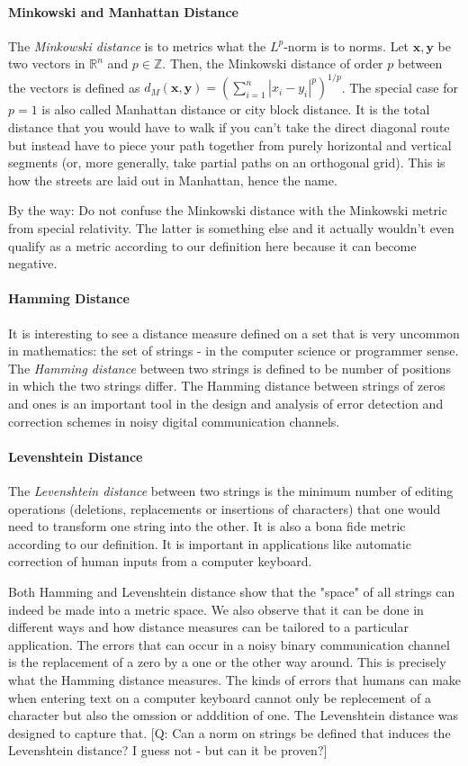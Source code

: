 \paragraph{Minkowski and Manhattan Distance}
The \emph{Minkowski distance} is to metrics what the $L^p$-norm is to norms. Let $\mathbf{x,y}$ be two vectors in $\mathbb{R}^n$ and $p \in \mathbb{Z}$. Then, the Minkowski distance of order $p$ between the vectors is defined as $d_M(\mathbf{x,y}) = (\sum_{i=1}^n |x_i - y_i|^p )^{1/p}$. The special case for $p=1$ is also called Manhattan distance or city block distance. It is the total distance that you would have to walk if you can't take the direct diagonal route but instead have to piece your path together from purely horizontal and vertical segments (or, more generally, take partial paths on an orthogonal grid). This is how the streets are laid out in Manhattan, hence the name. 

\medskip
By the way: Do not confuse the Minkowski distance with the Minkowski metric from special relativity. The latter is something else and it actually wouldn't even qualify as a metric according to our definition here because it can become negative.

\paragraph{Hamming Distance} 
It is interesting to see a distance measure defined on a set that is very uncommon in mathematics: the set of strings - in the computer science or programmer sense. The \emph{Hamming distance} between two strings is defined to be number of positions in which the two strings differ. The Hamming distance between strings of zeros and ones is an important tool in the design and analysis of error detection and correction schemes in noisy digital communication channels. 

\paragraph{Levenshtein Distance} 
The \emph{Levenshtein distance} between two strings is the minimum number of editing operations (deletions, replacements or insertions of characters) that one would need to transform one string into the other. It is also a bona fide metric according to our definition. It is important in applications like automatic correction of human inputs from a computer keyboard.

\medskip
Both Hamming and Levenshtein distance show that the "space" of all strings can indeed be made into a metric space. We also observe that it can be done in different ways and how distance measures can be tailored to a particular application. The errors that can occur in a noisy binary communication channel is the replacement of a zero by a one or the other way around. This is precisely what the Hamming distance measures. The kinds of errors that humans can make when entering text on a computer keyboard cannot only be replecement of a character but also the omssion or adddition of one. The Levenshtein distance was designed to capture that. [Q: Can a norm on strings be defined that induces the Levenshtein distance? I guess not - but can it be proven?] 

